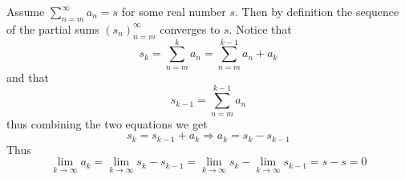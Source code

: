 \documentclass[11pt]{exam}
\newcommand{\qs}{\sum_{n=m}^{\infty}}
\begin{document}
\begin{enumerate}
\begin{solution}
                Assume $\qs a_n = s$ for some real number $s$. Then by definition the sequence of the 
                partial sums $(s_n)_{n=m}^\infty$ converges to $s$. Notice that 
                $$s_k = \sum_{n=m}^{k} a_n = \sum_{n=m}^{k-1} a_n + a_k$$ and that 
                $$s_{k-1} = \sum_{n=m}^{k-1} a_n$$ thus combining the two equations we get 
                $$s_k = s_{k-1} + a_k \Longrightarrow a_k = s_k - s_{k-1}$$
                Thus 
                $$\lim_{k \to \infty} a_k = \lim_{k \to \infty} s_k - s_{k-1} = \lim_{k \to \infty}
                s_k - \lim_{k \to \infty} s_{k-1} = s - s = 0
                $$
            \end{solution}
    \end{enumerate}
\end{document}
